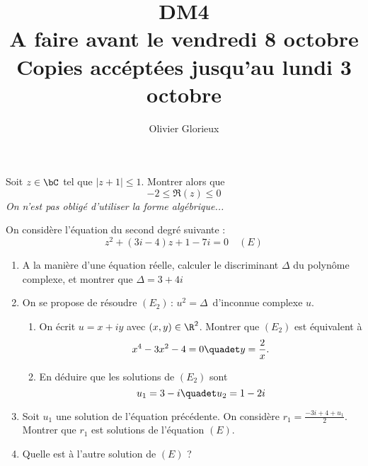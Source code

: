 \documentclass[a4paper, 11pt,reqno]{article}
\author{Olivier Glorieux}
\begin{document}
\title{DM4 \\
\small{A faire avant le  vendredi 8 octobre} \\
Copies accéptées jusqu'au lundi 3 octobre
}



\begin{exercice}
Soit $z\in \bC$ tel que $|z+1| \leq 1$. Montrer alors que 
$$-2\leq \Re(z)\leq 0$$
\footnotesize{ \textit{On n'est pas obligé d'utiliser la forme algébrique...} }

\end{exercice}

%
%
%
%


\begin{exercice}
On considère l'équation du second degré suivante : 
$$z^2+(3i-4)z+1-7i=0 \quad (E) $$

\begin{enumerate}
\item A la manière d'une équation réelle, calculer le discriminant $\Delta$ du polynôme complexe, et montrer que $\Delta=3+4i$
\item On se propose de résoudre $ (E_2) \, : \, u^2=\Delta \, $  d'inconnue complexe $u$. 
\begin{enumerate}
\item On écrit $u=x+iy$ avec $(x,y)\in \R^2$. Montrer que $(E_2)$ est équivalent à 
$$ x^4-3x^2-4=0 \quadet y =\frac{2}{x}.$$
\item En déduire que les solutions de $(E_2)$ sont 
$$u_1=3-i\quadet u_2=1-2i$$
\end{enumerate}
\item Soit $u_1$ une solution de l'équation précédente. 
On considère $r_1 = \frac{-3i+4 +u_1}{2}$. Montrer que $r_1$ est solutions de l'équation  $(E)$.
\item Quelle est à l'autre solution  de  $(E)$ ? 
\end{enumerate}

\end{exercice}
\end{document}
